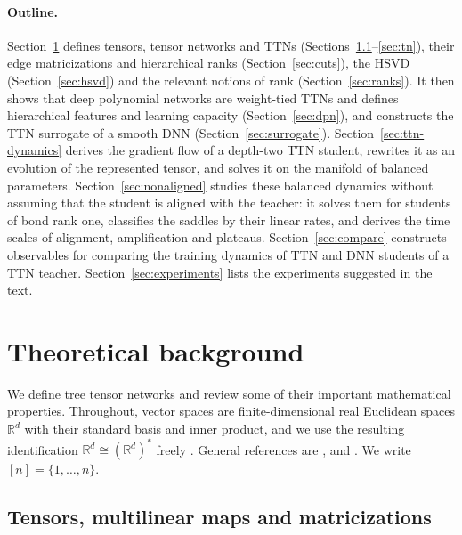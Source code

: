 \documentclass[11pt]{article}
\newcommand{\R}{\mathbb{R}}
\theoremstyle{definition}
\numberwithin{equation}{section}
\begin{document}
\paragraph{Outline.}
Section~\ref{sec:background} defines tensors, tensor networks and TTNs (Sections~\ref{sec:tensors}--\ref{sec:tn}), their edge matricizations and hierarchical ranks (Section~\ref{sec:cuts}), the HSVD (Section~\ref{sec:hsvd}) and the relevant notions of rank (Section~\ref{sec:ranks}). It then shows that deep polynomial networks are weight-tied TTNs and defines hierarchical features and learning capacity (Section~\ref{sec:dpn}), and constructs the TTN surrogate of a smooth DNN (Section~\ref{sec:surrogate}). Section~\ref{sec:ttn-dynamics} derives the gradient flow of a depth-two TTN student, rewrites it as an evolution of the represented tensor, and solves it on the manifold of balanced parameters. Section~\ref{sec:nonaligned} studies these balanced dynamics without assuming that the student is aligned with the teacher: it solves them for students of bond rank one, classifies the saddles by their linear rates, and derives the time scales of alignment, amplification and plateaus. Section~\ref{sec:compare} constructs observables for comparing the training dynamics of TTN and DNN students of a TTN teacher. Section~\ref{sec:experiments} lists the experiments suggested in the text.

\section{Theoretical background}\label{sec:background}

We define tree tensor networks and review some of their important mathematical properties. Throughout, vector spaces are finite-dimensional real Euclidean spaces $\R^d$ with their standard basis and inner product, and we use the resulting identification $\R^d\cong(\R^d)^*$ freely \citep[Appendix~A]{furman2026benign}. General references are \citet{kolda2009tensor}, \citet{hackbusch2012tensor} and \citet{lim2021tensors}. We write $[n]=\{1,\dots,n\}$.

\subsection{Tensors, multilinear maps and matricizations}\label{sec:tensors}
\end{document}
